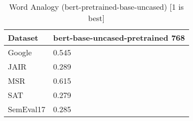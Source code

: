 \begin{table}[]
\centering
\begin{tabular}{l|l}
\hline
Dataset & bert-base-uncased-pretrained 768 \\
\hline
Google & 0.545 \\ 
JAIR & 0.289 \\ 
MSR & 0.615 \\ 
SAT & 0.279 \\ 
SemEval17 & 0.285
\end{tabular}
\caption{Word Analogy (bert-pretrained-base-uncased) [1 is best]}
\label{tab:analogy-bert-pretrained-base-uncased}
\end{table}
